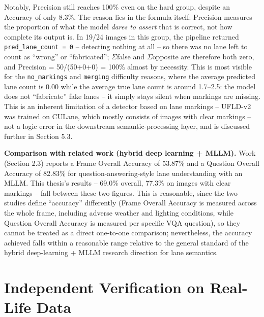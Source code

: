 \documentclass[12pt,a4paper]{report}
\begin{document}
Notably, Precision still reaches 100\% even on the hard group, despite an Accuracy of only 8.3\%. The reason lies in the formula itself: Precision measures the proportion of what the model \textit{dares to assert} that is correct, not how complete its output is. In 19/24 images in this group, the pipeline returned \texttt{pred\_lane\_count = 0} -- detecting nothing at all -- so there was no lane left to count as ``wrong'' or ``fabricated''; $\Sigma$false and $\Sigma$opposite are therefore both zero, and Precision = 50/(50+0+0) = 100\% almost by necessity. This is most visible for the \texttt{no\_markings} and \texttt{merging} difficulty reasons, where the average predicted lane count is 0.00 while the average true lane count is around 1.7--2.5: the model does not ``fabricate'' fake lanes -- it simply stays silent when markings are missing. This is an inherent limitation of a detector based on lane markings -- UFLD-v2 was trained on CULane, which mostly consists of images with clear markings -- not a logic error in the downstream semantic-processing layer, and is discussed further in Section 5.3.

\textbf{Comparison with related work (hybrid deep learning + MLLM).} Work \cite{sah2025advancing} (Section 2.3) reports a Frame Overall Accuracy of 53.87\% and a Question Overall Accuracy of 82.83\% for question-answering-style lane understanding with an MLLM. This thesis's results -- 69.0\% overall, 77.3\% on images with clear markings -- fall between these two figures. This is reasonable, since the two studies define ``accuracy'' differently (Frame Overall Accuracy is measured across the whole frame, including adverse weather and lighting conditions, while Question Overall Accuracy is measured per specific VQA question), so they cannot be treated as a direct one-to-one comparison; nevertheless, the accuracy achieved falls within a reasonable range relative to the general standard of the hybrid deep-learning + MLLM research direction for lane semantics.

\section{Independent Verification on Real-Life Data}
\end{document}
